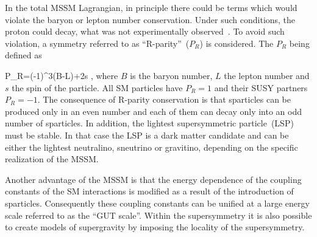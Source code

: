 



In the total MSSM Lagrangian, in principle there could be terms which would violate the baryon or lepton number conservation. Under such conditions, the proton could decay, what was not experimentally observed~\cite{Nishino:2009aa}. To avoid such violation, a symmetry referred to as ``R-parity''~($P_{R}$) is considered. The $P_{R}$ being defined as

{
P_R=(-1)^{3(B-L)+2s },
}
where $B$ is the baryon number, $L$ the lepton number and $s$ the spin of the particle. All SM particles have $P_{R}=1$ and their SUSY partners $P_{R}=-1$. The consequence of R-parity conservation is that sparticles can be produced only in an even number and each of them can decay only into an odd number of sparticles. In addition, the lightest supersymmetric particle~(LSP) must be stable. In that case the LSP is a dark matter candidate and can be either the lightest neutralino, sneutrino or gravitino, depending on the specific realization of the MSSM. 

Another advantage of the MSSM is that the energy dependence of the coupling constants of the SM interactions is modified as a result of the introduction of sparticles. Consequently these coupling constants can be unified at a large energy scale referred to as  the ``GUT scale''. Within the supersymmetry it is also possible to create models of supergravity by imposing the locality of the supersymmetry.



